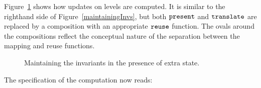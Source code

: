 Figure~\ref{maintainExtraState} shows how updates on levels are computed. It is similar to the righthand side of Figure~\ref{maintainingInvs}, but both ${\tt present}$ and ${\tt translate}$ are replaced by a composition with an appropriate ${\tt reuse}$ function. The ovals around the compositions reflect the conceptual nature of the separation between the mapping and reuse functions. 

\begin{figure}
\begin{center}
\begin{center}
\end{center}
\caption{Maintaining the invariants in the presence of extra state.}\label{maintainExtraState} 
\end{center}
\end{figure}



The specification of the computation now reads: 

